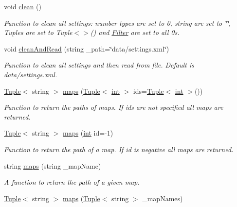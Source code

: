 \begin{DoxyCompactItemize}
void \mbox{\hyperlink{class_settings_a8ad60105ab9848720d05ebd19c5063f2}{clean}} ()
\begin{DoxyCompactList}\small\item\em Function to clean all settings\+: number types are set to 0, string are set to \char`\"{}\char`\"{}, Tuples are set to Tuple$<$$>$() and \mbox{\hyperlink{class_filter}{Filter}} are set to all 0s. \end{DoxyCompactList}\item 
void \mbox{\hyperlink{class_settings_a2157ac946bff77fef41a2fba737ae4c2}{clean\+And\+Read}} (string \+\_\+path=\char`\"{}data/settings.\+xml\char`\"{})
\begin{DoxyCompactList}\small\item\em Function to clean all settings and then read from file. Default is data/settings.\+xml. \end{DoxyCompactList}\item 
\mbox{\hyperlink{class_tuple}{Tuple}}$<$ string $>$ \mbox{\hyperlink{class_settings_aa924e455cc6ac356ba6a4c59ab09591c}{maps}} (\mbox{\hyperlink{class_tuple}{Tuple}}$<$ \mbox{\hyperlink{draw_8hh_aa620a13339ac3a1177c86edc549fda9b}{int}} $>$ ids=\mbox{\hyperlink{class_tuple}{Tuple}}$<$ \mbox{\hyperlink{draw_8hh_aa620a13339ac3a1177c86edc549fda9b}{int}} $>$())
\begin{DoxyCompactList}\small\item\em Function to return the paths of maps. If ids are not specified all maps are returned. \end{DoxyCompactList}\item 
\mbox{\hyperlink{class_tuple}{Tuple}}$<$ string $>$ \mbox{\hyperlink{class_settings_adc050f187f4040f5e897b2ff41caedd0}{maps}} (\mbox{\hyperlink{draw_8hh_aa620a13339ac3a1177c86edc549fda9b}{int}} id=-\/1)
\begin{DoxyCompactList}\small\item\em Function to return the path of a map. If id is negative all maps are returned. \end{DoxyCompactList}\item 
string \mbox{\hyperlink{class_settings_aa34e6004beffad1bc5fd81f99353d3e1}{maps}} (string \+\_\+map\+Name)
\begin{DoxyCompactList}\small\item\em A function to return the path of a given map. \end{DoxyCompactList}\item 
\mbox{\hyperlink{class_tuple}{Tuple}}$<$ string $>$ \mbox{\hyperlink{class_settings_ab638c9895f57ed5e8ab64084752c660d}{maps}} (\mbox{\hyperlink{class_tuple}{Tuple}}$<$ string $>$ \+\_\+map\+Names)

\end{DoxyCompactItemize}
